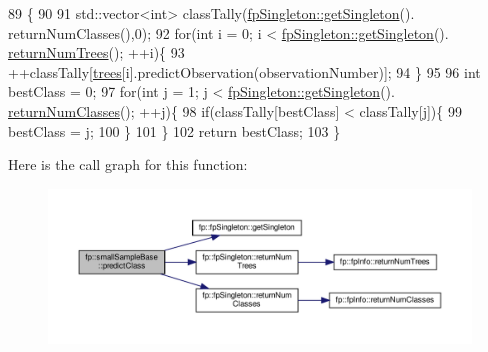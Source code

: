 \begin{DoxyCode}
89                                                    \{
90 
91                 std::vector<int> classTally(\hyperlink{classfp_1_1fpSingleton_a8bdae77b68521003e3fc630edec2e240}{fpSingleton::getSingleton}().
      returnNumClasses(),0);
92                 \textcolor{keywordflow}{for}(\textcolor{keywordtype}{int} i = 0; i < \hyperlink{classfp_1_1fpSingleton_a8bdae77b68521003e3fc630edec2e240}{fpSingleton::getSingleton}().
      \hyperlink{classfp_1_1fpSingleton_a8be36616345b6b77ce4c60b99cc2b91c}{returnNumTrees}(); ++i)\{
93                     ++classTally[\hyperlink{classfp_1_1smallSampleBase_a9a3d92948248f1809d9f025b553512b6}{trees}[i].predictObservation(observationNumber)];
94                 \}
95 
96                 \textcolor{keywordtype}{int} bestClass = 0;
97                 \textcolor{keywordflow}{for}(\textcolor{keywordtype}{int} j = 1; j < \hyperlink{classfp_1_1fpSingleton_a8bdae77b68521003e3fc630edec2e240}{fpSingleton::getSingleton}().
      \hyperlink{classfp_1_1fpSingleton_a5602580110329a6b25602b1789e4e2c2}{returnNumClasses}(); ++j)\{
98                     \textcolor{keywordflow}{if}(classTally[bestClass] < classTally[j])\{
99                         bestClass = j;
100                     \}
101                 \}
102                 \textcolor{keywordflow}{return} bestClass;
103             \}
\end{DoxyCode}
Here is the call graph for this function\+:\nopagebreak
\begin{figure}[H]
\begin{center}
\leavevmode
\includegraphics[width=350pt]{classfp_1_1smallSampleBase_a616b7c06887cf4a1ac919bc3846a7933_cgraph}
\end{center}
\end{figure}
\mbox{\label{classfp_1_1smallSampleBase_a1e3244a9a15d53d38e6c9ca78d8d062e}} 
